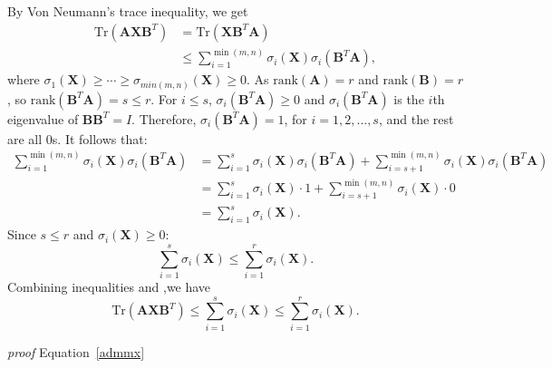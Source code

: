 \documentclass[fontset=windows]{article}
\begin{document}
{By Von Neumann's trace inequality, we get
\begin{equation}
    \begin{aligned}
        \text{Tr}(\mathbf A\mathbf X\mathbf B^T) & = \text{Tr}(\mathbf X\mathbf B^T\mathbf A) \\
        & \leq  \sum_{i=1}^{\min(m,n)} \sigma_i(\mathbf X) \sigma_i(\mathbf B^T\mathbf A),
    \end{aligned}
\end{equation}
where $\sigma_1(\mathbf X) \geq \cdots \geq \sigma_{min(m,n)}(\mathbf X) \geq 0 $. As $\text{rank}(\mathbf A) = r$ and $\text{rank}(\mathbf B) =r$, so $\text{rank}(\mathbf B^T\mathbf A) =s \leq r$. For $i \leq s$, $\sigma_i(\mathbf B^T\mathbf A) \geq 0$ and $\sigma_i(\mathbf B^T\mathbf A)$ is the $i$th eigenvalue of $\mathbf B\mathbf B^T=I$. Therefore, $\sigma_i(\mathbf B^T\mathbf A) = 1$, for $i=1,2,\dots,s$, and the rest are all 0s. It follows that:
\begin{equation}
    \begin{aligned}
        \sum_{i=1}^{\min(m,n)} \sigma_i(\mathbf X) \sigma_i(\mathbf B^T\mathbf A) & = \sum_{i=1}^{s} \sigma_i(\mathbf X) \sigma_i(\mathbf B^T\mathbf A) + \sum_{i=s+1}^{\min(m,n)} \sigma_i(\mathbf X) \sigma_i(\mathbf B^T\mathbf A) \\
        & = \sum_{i=1}^{s} \sigma_i(\mathbf X) \cdot 1 + \sum_{i=s+1}^{\min(m,n)} \sigma_i(\mathbf X) \cdot 0 \\
        & = \sum_{i=1}^{s} \sigma_i(\mathbf X).
    \end{aligned}
\end{equation}
Since $s \leq r$ and $\sigma_i(\mathbf X) \geq 0$:
\begin{equation*}
    \sum_{i=1}^s \sigma_i(\mathbf X)\leq \sum_{i=1}^r \sigma_i(\mathbf X).
\end{equation*}
Combining inequalities and ,we have 
\begin{equation}
    \text{Tr}(\mathbf A\mathbf X\mathbf B^T) \leq \sum_{i=1}^s \sigma_i(\mathbf X)\leq \sum_{i=1}^r \sigma_i(\mathbf X).
\end{equation}


\textit{proof} Equation~\ref{admmx}

}
\end{document}
